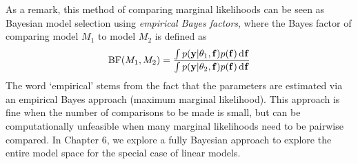 As a remark, this method of comparing marginal likelihoods can be seen as Bayesian model selection using \emph{empirical Bayes factors}, where the Bayes factor of comparing model $M_1$ to model $M_2$ is defined as
\[
  \operatorname{BF}(M_1,M_2) = \frac{\int p({\mathbf y}|\theta_1,{\mathbf f})p({\mathbf f}) \operatorname{d}\hspace{0.5pt}\! {\mathbf f} }{\int p({\mathbf y}|\theta_2,{\mathbf f})p({\mathbf f}) \operatorname{d}\hspace{0.5pt}\! {\mathbf f}}
\]
The word ‘empirical’ stems from the fact that the parameters are estimated via an empirical Bayes approach (maximum marginal likelihood).
This approach is fine when the number of comparisons to be made is small, but can be computationally unfeasible when many marginal likelihoods need to be pairwise compared.
In Chapter 6, we explore a fully Bayesian approach to explore the entire model space for the special case of linear models.



